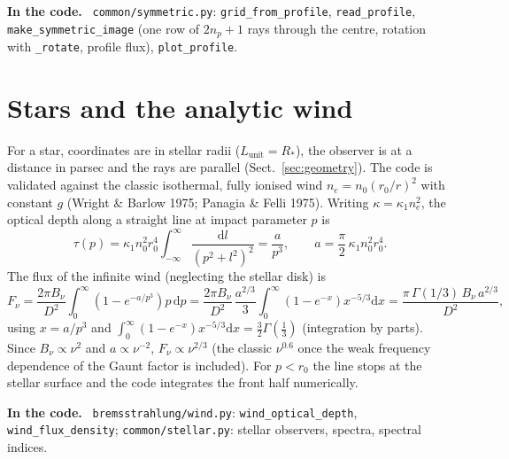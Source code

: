 \documentclass[11pt,a4paper]{article}
\newcommand{\code}[1]{\texttt{#1}}
\newcommand{\dd}{\mathrm{d}}
\newenvironment{incode}{\par\smallskip\noindent\begin{minipage}{\linewidth}\small\color{accent!80!black}\textbf{In the code.}~}{\end{minipage}\par\smallskip}
\begin{document}
\begin{incode}
\code{common/symmetric.py}: \code{grid\_from\_profile}, \code{read\_profile},
\code{make\_symmetric\_image} (one row of $2n_p+1$ rays through the centre, rotation with
\code{\_rotate}, profile flux), \code{plot\_profile}.
\end{incode}

\section{Stars and the analytic wind}\label{sec:stars}

For a star, coordinates are in stellar radii ($L_\text{unit}=R_\ast$), the observer is at a
distance in parsec and the rays are parallel (Sect.~\ref{sec:geometry}). The code is validated
against the classic isothermal, fully ionised wind $n_e=n_0(r_0/r)^2$ with constant $g$ (Wright \&
Barlow 1975; Panagia \& Felli 1975). Writing $\kappa=\kappa_1n_e^2$, the optical depth along a
straight line at impact parameter $p$ is
\begin{equation}
  \tau(p)=\kappa_1n_0^2r_0^4\int_{-\infty}^{\infty}\frac{\dd l}{(p^2+l^2)^2}
        =\frac{a}{p^3},\qquad a=\frac{\pi}{2}\,\kappa_1n_0^2r_0^4 .
\end{equation}
The flux of the infinite wind (neglecting the stellar disk) is
\begin{equation}
  F_\nu=\frac{2\pi B_\nu}{D^2}\int_0^\infty\left(1-e^{-a/p^3}\right)p\,\dd p
       =\frac{2\pi B_\nu}{D^2}\,\frac{a^{2/3}}{3}\int_0^\infty\left(1-e^{-x}\right)x^{-5/3}\dd x
       =\frac{\pi\,\Gamma(1/3)\,B_\nu\,a^{2/3}}{D^2},
\end{equation}
using $x=a/p^3$ and $\int_0^\infty(1-e^{-x})x^{-5/3}\dd x=\tfrac32\Gamma(\tfrac13)$ (integration
by parts). Since $B_\nu\propto\nu^2$ and $a\propto\nu^{-2}$, $F_\nu\propto\nu^{2/3}$ (the classic
$\nu^{0.6}$ once the weak frequency dependence of the Gaunt factor is included). For $p<r_0$ the
line stops at the stellar surface and the code integrates the front half numerically.

\begin{incode}
\code{bremsstrahlung/wind.py}: \code{wind\_optical\_depth}, \code{wind\_flux\_density};
\code{common/stellar.py}: stellar observers, spectra, spectral indices.
\end{incode}

\end{document}
